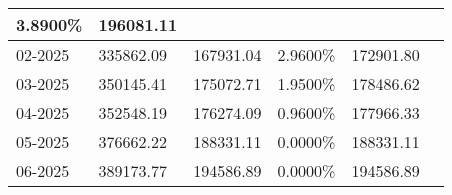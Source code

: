\documentclass{report}
\begin{document}
\begin{longtable}[c]{|p{1.7cm}|p{2.6cm}|p{2.6cm}|p{2.3cm}|p{2.3cm}|c|}
3.8900\% & 196081.11\\ \hline02-2025 & 335862.09 & 167931.04 & 2.9600\% & 172901.80\\ \hline03-2025 & 350145.41 & 175072.71 & 1.9500\% & 178486.62\\ \hline04-2025 & 352548.19 & 176274.09 & 0.9600\% & 177966.33\\ \hline05-2025 & 376662.22 & 188331.11 & 0.0000\% & 188331.11\\ \hline06-2025 & 389173.77 & 194586.89 & 0.0000\% & 194586.89\\ \hline
\end{longtable}
\end{document}

